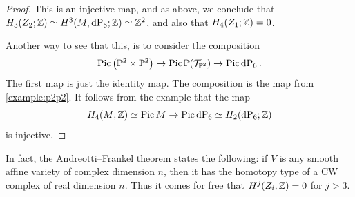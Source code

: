 \begin{proof}
This is an injective map, and as above, we conclude that $H_3(Z_2;\Z) \simeq H^3(M,\dP6;\Z) \simeq \Z^2$, and also that $H_4(Z_1;\mathbb{Z})=0$.

Another way to see that this, is to consider the composition
\[
\Pic \left( \P^2 \times \P^2 \right) \to \Pic \P(\mathcal T_{\P^2}) \to \Pic \dP6.
\]
The first map is just the identity map. The composition is the map from \cref{example:p2p2}. It follows from the example that the map
\[
H_4(M; \Z) \simeq \Pic M \to \Pic \dP6 \simeq H_ 2(\dP6; \Z)
\]
is injective.
\end{proof}

\begin{remark}
In fact, the Andreotti--Frankel theorem \cite{andreotti_affinecw} states the following: if $V$ is any smooth affine variety of complex dimension $n$, then it has the homotopy type of a CW complex of real dimension $n$. Thus it comes for free that $H^j(Z_i,\mathbb{Z})=0$ for $j > 3$.
\end{remark}
 